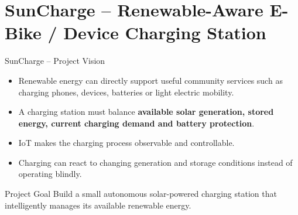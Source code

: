 \part[nopartpage]{SunCharge -- Renewable-Aware E-Bike / Device Charging Station}

\begin{frame}{SunCharge -- Project Vision}
\begin{itemize}
    \item Renewable energy can directly support useful community services such as charging phones, devices, batteries or light electric mobility.
    \item A charging station must balance \textbf{available solar generation, stored energy, current charging demand and battery protection}.
    \item IoT makes the charging process observable and controllable.
    \item Charging can react to changing generation and storage conditions instead of operating blindly.
\end{itemize}

\begin{block}{Project Goal}
Build a small autonomous solar-powered charging station that intelligently manages its available renewable energy.
\end{block}
\end{frame}
